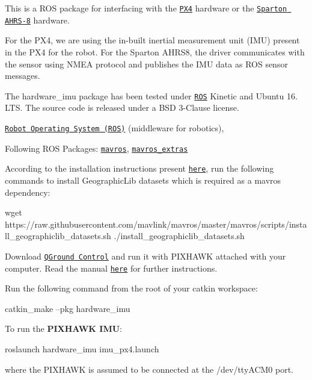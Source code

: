 This is a R\+OS package for interfacing with the \href{http://px4.io/}{\tt P\+X4} hardware or the \href{https://www.spartonnavex.com/product/ahrs-8/}{\tt Sparton A\+H\+R\+S-\/8} hardware.

For the P\+X4, we are using the in-\/built inertial measurement unit (I\+MU) present in the P\+X4 for the robot. For the Sparton A\+H\+R\+S8, the driver communicates with the sensor using N\+M\+EA protocol and publishes the I\+MU data as R\+OS sensor messages.

The {\ttfamily hardware\+\_\+imu} package has been tested under \href{http://www.ros.org}{\tt R\+OS} Kinetic and Ubuntu 16. L\+TS. The source code is released under a B\+SD 3-\/\+Clause license.


\begin{DoxyItemize}
\item \href{http://wiki.ros.org}{\tt Robot Operating System (R\+OS)} (middleware for robotics),
\item Following R\+OS Packages\+: \href{http://wiki.ros.org/mavros}{\tt mavros}, \href{http://wiki.ros.org/mavros_extras}{\tt mavros\+\_\+extras}
\end{DoxyItemize}

According to the installation instructions present \href{https://github.com/mavlink/mavros/blob/master/mavros/README.md#binary-installation-deb}{\tt here}, run the following commands to install Geographic\+Lib datasets which is required as a mavros dependency\+: 
\begin{DoxyCode}
wget
       https://raw.githubusercontent.com/mavlink/mavros/master/mavros/scripts/install\_geographiclib\_datasets.sh
./install\_geographiclib\_datasets.sh
\end{DoxyCode}


Download \href{https://docs.qgroundcontrol.com/en/getting_started/download_and_install.html}{\tt Q\+Ground Control} and run it with P\+I\+X\+H\+A\+WK attached with your computer. Read the manual \href{https://docs.qgroundcontrol.com/en/SetupView/Sensors.html}{\tt here} for further instructions.

Run the following command from the root of your catkin workspace\+: 
\begin{DoxyCode}
catkin\_make --pkg hardware\_imu
\end{DoxyCode}


To run the {\bfseries P\+I\+X\+H\+A\+WK I\+MU}\+: 
\begin{DoxyCode}
roslaunch hardware\_imu imu\_px4.launch
\end{DoxyCode}
 where the P\+I\+X\+H\+A\+WK is assumed to be connected at the {\ttfamily /dev/tty\+A\+C\+M0} port.

